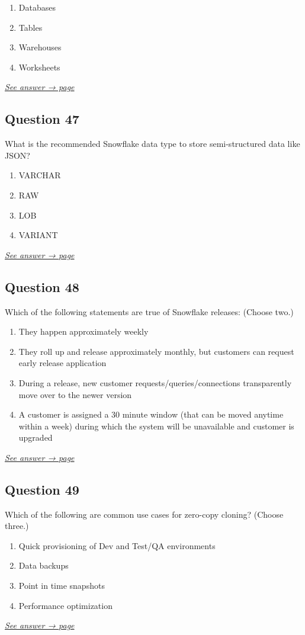\documentclass[12pt]{article}
\newcommand{\seeanswer}[1]{%
  \par\smallskip\emph{\hyperref[ans:#1]{See answer → page \pageref{ans:#1}}}%
}
\begin{document}
\begin{enumerate}[label=\Alph*.]
  \item Databases
  \item Tables
  \item Warehouses
  \item Worksheets
\end{enumerate}
\seeanswer{46}

\subsection*{Question 47}\label{q:47}
What is the recommended Snowflake data type to store semi-structured data like JSON?

\begin{enumerate}[label=\Alph*.]
  \item VARCHAR
  \item RAW
  \item LOB
  \item VARIANT
\end{enumerate}
\seeanswer{47}

\subsection*{Question 48}\label{q:48}
Which of the following statements are true of Snowflake releases: (Choose two.)

\begin{enumerate}[label=\Alph*.]
  \item They happen approximately weekly
  \item They roll up and release approximately monthly, but customers can request early release application
  \item During a release, new customer requests/queries/connections transparently move over to the newer version
  \item A customer is assigned a 30 minute window (that can be moved anytime within a week) during which the system will be unavailable and customer is upgraded
\end{enumerate}
\seeanswer{48}

\subsection*{Question 49}\label{q:49}
Which of the following are common use cases for zero-copy cloning? (Choose three.)

\begin{enumerate}[label=\Alph*.]
  \item Quick provisioning of Dev and Test/QA environments
  \item Data backups
  \item Point in time snapshots
  \item Performance optimization
\end{enumerate}
\seeanswer{49}
\end{document}
